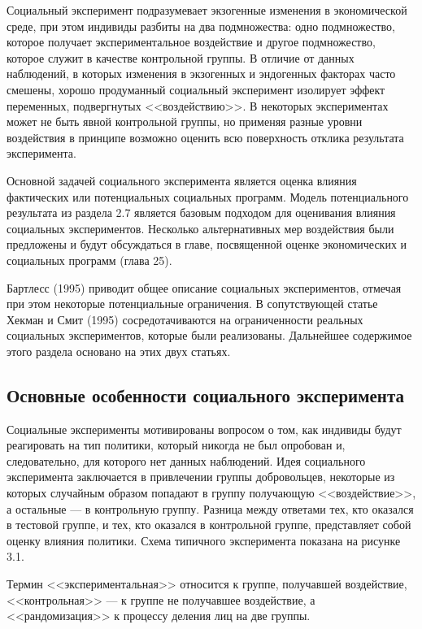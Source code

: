 Социальный эксперимент подразумевает экзогенные изменения в экономической среде, при этом  индивиды разбиты на два подмножества:  одно подмножество, которое получает экспериментальное воздействие и другое подмножество, которое служит в качестве контрольной группы. 
В отличие от данных наблюдений, в которых изменения в экзогенных и эндогенных факторах часто смешены, хорошо продуманный социальный эксперимент 
изолирует  эффект переменных, подвергнутых <<воздействию>>. В некоторых экспериментах может не быть явной контрольной группы, но применяя разные уровни воздействия в принципе возможно  оценить всю поверхность отклика результата эксперимента.


Основной задачей социального эксперимента является оценка влияния фактических или потенциальных социальных программ. Модель потенциального результата из раздела 2.7 является базовым подходом для оценивания влияния социальных экспериментов. Несколько альтернативных мер воздействия были предложены и будут обсуждаться в главе, посвященной оценке экономических и социальных программ (глава 25).


Бартлесс (1995) приводит общее описание социальных экспериментов, отмечая при этом некоторые потенциальные ограничения. В сопутствующей статье Хекман и Смит (1995) сосредотачиваются на ограниченности реальных социальных экспериментов, которые были реализованы. Дальнейшее содержимое этого раздела основано на этих двух статьях. 


\subsection{Основные особенности социального эксперимента}


Социальные эксперименты мотивированы вопросом о том, как индивиды будут реагировать на тип политики, который никогда не был опробован и, следовательно, для которого нет данных наблюдений. Идея социального эксперимента заключается в привлечении группы добровольцев, некоторые из которых случайным образом попадают в группу получающую <<воздействие>>, а остальные --- в контрольную группу. Разница между ответами тех, кто оказался в тестовой группе, и тех, кто оказался  в контрольной группе, представляет собой оценку влияния политики. Схема типичного эксперимента показана на рисунке 3.1.


Термин <<экспериментальная>> относится к группе, получавшей воздействие, <<контрольная>> --- к группе не получавшее воздействие, а <<рандомизация>> к процессу деления лиц на две группы.


